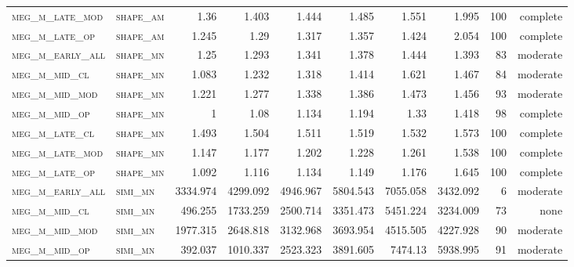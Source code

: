 \begin{landscape}
\begin{center}
\begin{footnotesize}
\begin{longtable}{llrrrrr|rrr}
\textsc{meg\_m\_late\_mod } & \textsc{shape\_am }    & 1.36     & 1.403    & 1.444    & 1.485    & 1.551      & 1.995         & 100           & complete             \\
\textsc{meg\_m\_late\_op  } & \textsc{shape\_am }    & 1.245    & 1.29     & 1.317    & 1.357    & 1.424      & 2.054         & 100           & complete             \\
\textsc{meg\_m\_early\_all} & \textsc{shape\_mn }    & 1.25     & 1.293    & 1.341    & 1.378    & 1.444      & 1.393         & 83            & moderate              \\
\textsc{meg\_m\_mid\_cl   } & \textsc{shape\_mn }    & 1.083    & 1.232    & 1.318    & 1.414    & 1.621      & 1.467         & 84            & moderate              \\
\textsc{meg\_m\_mid\_mod  } & \textsc{shape\_mn }    & 1.221    & 1.277    & 1.338    & 1.386    & 1.473      & 1.456         & 93            & moderate              \\
\textsc{meg\_m\_mid\_op   } & \textsc{shape\_mn }    & 1        & 1.08     & 1.134    & 1.194    & 1.33       & 1.418         & 98            & complete              \\
\textsc{meg\_m\_late\_cl  } & \textsc{shape\_mn }    & 1.493    & 1.504    & 1.511    & 1.519    & 1.532      & 1.573         & 100           & complete             \\
\textsc{meg\_m\_late\_mod } & \textsc{shape\_mn }    & 1.147    & 1.177    & 1.202    & 1.228    & 1.261      & 1.538         & 100           & complete             \\
\textsc{meg\_m\_late\_op  } & \textsc{shape\_mn }    & 1.092    & 1.116    & 1.134    & 1.149    & 1.176      & 1.645         & 100           & complete             \\
\textsc{meg\_m\_early\_all} & \textsc{simi\_mn  }    & 3334.974 & 4299.092 & 4946.967 & 5804.543 & 7055.058   & 3432.092      & 6             & moderate             \\
\textsc{meg\_m\_mid\_cl   } & \textsc{simi\_mn  }    & 496.255  & 1733.259 & 2500.714 & 3351.473 & 5451.224   & 3234.009      & 73            & none              \\
\textsc{meg\_m\_mid\_mod  } & \textsc{simi\_mn  }    & 1977.315 & 2648.818 & 3132.968 & 3693.954 & 4515.505   & 4227.928      & 90            & moderate              \\
\textsc{meg\_m\_mid\_op   } & \textsc{simi\_mn  }    & 392.037  & 1010.337 & 2523.323 & 3891.605 & 7474.13    & 5938.995      & 91            & moderate              \\

\end{longtable}
\end{footnotesize}
\end{center}
\end{landscape}
